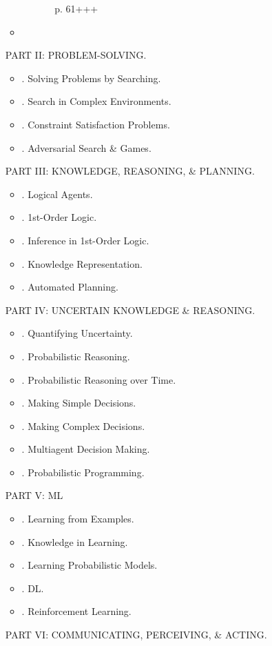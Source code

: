 \documentclass{article}
\begin{document}
\begin{itemize}
\begin{itemize}
\begin{itemize}
\begin{itemize}
				p. 61+++				
			\end{itemize}
		\end{itemize}
		\item 
	\end{itemize}
	PART II: PROBLEM-SOLVING.
	\begin{itemize}
		\item {. Solving Problems by Searching.}
		\item {. Search in Complex Environments.}
		\item {. Constraint Satisfaction Problems.}
		\item {. Adversarial Search \& Games.}
	\end{itemize}
	PART III: KNOWLEDGE, REASONING, \& PLANNING.
	\begin{itemize}
		\item {. Logical Agents.}
		\item {. 1st-Order Logic.}
		\item {. Inference in 1st-Order Logic.}
		\item {. Knowledge Representation.}
		\item {. Automated Planning.}
	\end{itemize}
	PART IV: UNCERTAIN KNOWLEDGE \& REASONING.
	\begin{itemize}
		\item {. Quantifying Uncertainty.}
		\item {. Probabilistic Reasoning.}
		\item {. Probabilistic Reasoning over Time.}
		\item {. Making Simple Decisions.}
		\item {. Making Complex Decisions.}
		\item {. Multiagent Decision Making.}
		\item {. Probabilistic Programming.}
	\end{itemize}
	PART V: ML
	\begin{itemize}
		\item {. Learning from Examples.}
		\item {. Knowledge in Learning.}
		\item {. Learning Probabilistic Models.}
		\item {. DL.}
		\item {. Reinforcement Learning.}
	\end{itemize}
	PART VI: COMMUNICATING, PERCEIVING, \& ACTING.
	\begin{itemize}

\end{itemize}
\end{itemize}
\end{document}
